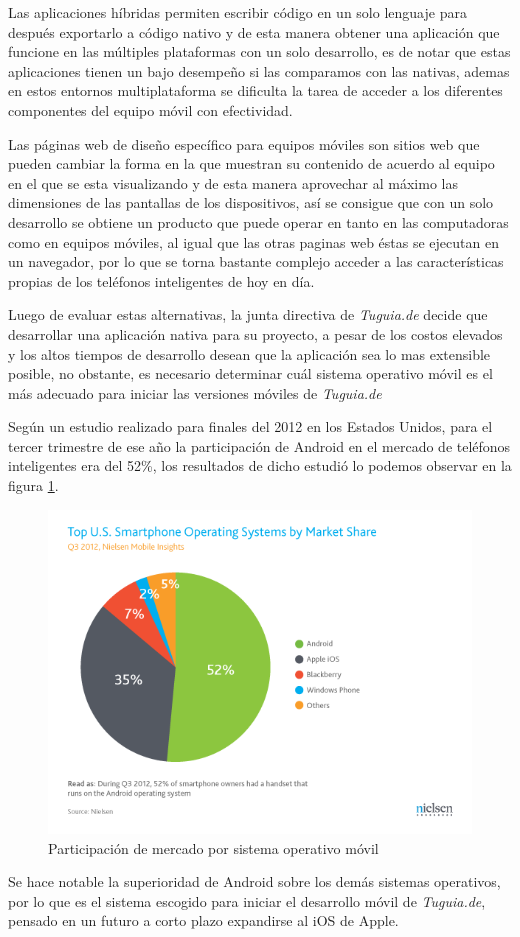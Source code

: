 Las aplicaciones híbridas permiten escribir código en un solo lenguaje para después exportarlo a código nativo y de esta manera obtener una aplicación que funcione en las múltiples plataformas con un solo desarrollo, es de notar que estas aplicaciones tienen un bajo desempeño si las comparamos con las nativas, ademas en estos entornos multiplataforma se dificulta la tarea de acceder a los diferentes componentes del equipo móvil con efectividad. 

Las páginas web de diseño específico para equipos móviles son sitios web que pueden cambiar la forma en la que muestran su contenido de acuerdo al equipo en el que se esta visualizando y de esta manera aprovechar al máximo las dimensiones de las pantallas de los dispositivos, así se consigue que con un solo desarrollo se obtiene un producto que puede operar en tanto en las computadoras como en equipos móviles, al igual que las otras paginas web éstas se ejecutan en un navegador, por lo que se torna bastante complejo acceder a las características propias de los teléfonos inteligentes de hoy en día. 

Luego de evaluar estas alternativas, la junta directiva de \textit{Tuguia.de} decide que desarrollar una aplicación nativa para su proyecto, a pesar de los costos elevados y los altos tiempos de desarrollo desean que la aplicación sea lo mas extensible posible, no obstante, es necesario determinar cuál sistema operativo móvil es el más adecuado para iniciar las versiones móviles de \textit{Tuguia.de}

Según un estudio realizado para finales del 2012 en los Estados Unidos,\cite{NTD} para el tercer trimestre de ese año la participación de Android en el mercado de teléfonos inteligentes era del 52\%, los resultados de dicho estudió lo podemos observar en la figura \ref{fig:marketshare}.
   
\begin{figure}[h]
	\begin{center}
		\includegraphics[scale=0.5]{imagenes/Q3-2012-US-Smartphone-OS-market-share.png}
	\end{center}
	\caption{
		\label{fig:marketshare}
		Participación de mercado por sistema operativo móvil \cite{NTD}
	}
\end{figure}

Se hace notable la superioridad de Android sobre los demás sistemas operativos, por lo que es el sistema escogido para iniciar el desarrollo móvil de \textit{Tuguia.de}, pensado en un futuro a corto plazo expandirse al iOS de Apple.
